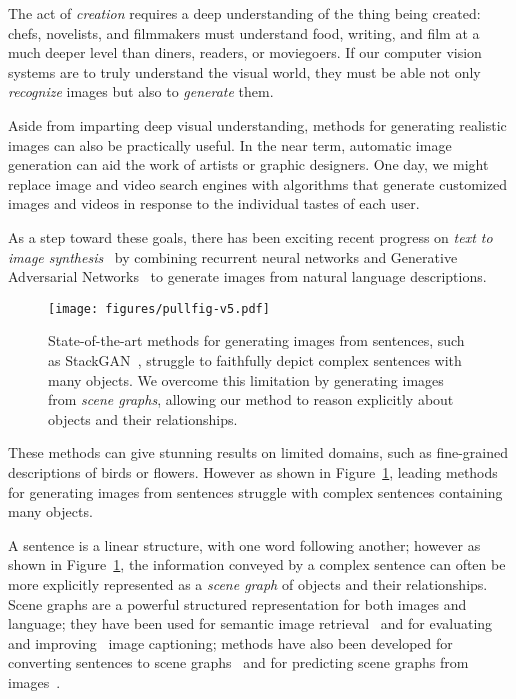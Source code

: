 \documentclass[10pt,twocolumn,letterpaper]{article}
\begin{document}
The act of \emph{creation} requires a deep understanding of the thing being
created: chefs, novelists, and filmmakers must understand food, writing, and film at a much deeper level than diners, readers, or moviegoers. If our computer vision systems are to truly understand the visual world, they must be able not only
\emph{recognize} images but also to \emph{generate} them.

Aside from imparting deep visual understanding, methods for generating
realistic images can also be practically useful. In the near term, automatic image generation can aid the work of artists or graphic designers. One day, we might replace image and video search engines with algorithms that generate customized images and videos in response to the individual tastes of each user.

As a step toward these goals, there has been exciting recent progress on \emph{text to image synthesis}~\cite{reed2016learning,reed2016generative,reed2017parallel,zhang2017stackgan} by combining recurrent neural networks and Generative Adversarial Networks~\cite{goodfellow2014generative} to generate images from natural language descriptions.

\begin{figure}
  \centering
  \texttt{[image: figures/pullfig-v5.pdf]}
  \caption{
    State-of-the-art methods for generating images from sentences, such as
    StackGAN~\cite{zhang2017stackgan}, struggle to faithfully depict complex
    sentences with many objects. We overcome this limitation by generating images
    from \emph{scene graphs}, allowing our method to reason explicitly about
    objects and their relationships.
  }
  \vspace{-2mm}
  \label{fig:pull}
\end{figure}

These methods can give stunning results on limited domains, such as fine-grained descriptions of birds or flowers. However as shown in Figure~\ref{fig:pull}, leading methods for generating images from sentences struggle with complex sentences containing many objects.

A sentence is a linear structure, with one word following another; 
however as shown in Figure~\ref{fig:pull}, the information conveyed by a complex
sentence can often be more explicitly represented as a \emph{scene graph} of
objects and their relationships. Scene graphs are a powerful structured 
representation for both images and language; they have been used
for semantic image retrieval~\cite{johnson2015image} and for evaluating~\cite{anderson2016spice} and improving~\cite{liu2017improved} image captioning; methods have also been developed for converting sentences to scene graphs~\cite{schuster2015generating} and for predicting scene graphs from images~\cite{lu2016visual,newell2017pixels,xu2017scene,yang2017support}.
\end{document}
